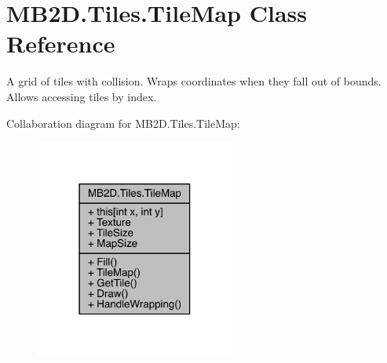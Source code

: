 \hypertarget{class_m_b2_d_1_1_tiles_1_1_tile_map}{}\section{M\+B2\+D.\+Tiles.\+Tile\+Map Class Reference}
\label{class_m_b2_d_1_1_tiles_1_1_tile_map}


A grid of tiles with collision. Wraps coordinates when they fall out of bounds. Allows accessing tiles by index.  




Collaboration diagram for M\+B2\+D.\+Tiles.\+Tile\+Map\+:\nopagebreak
\begin{figure}[H]
\begin{center}
\leavevmode
\includegraphics[width=186pt]{class_m_b2_d_1_1_tiles_1_1_tile_map__coll__graph}
\end{center}
\end{figure}
